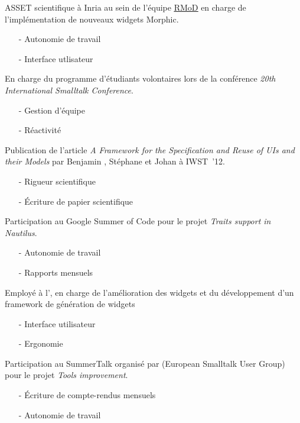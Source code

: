 \begin{rubric}{%
}
\entry*[01/03/2013 - 31/03/2013]
ASSET scientifique à Inria au sein de l'équipe \href{http://rmod.inria.fr/}{\underline{RMoD}} en charge de l'implémentation de nouveaux widgets Morphic.
\begin{itemize}
	\item[- ] Autonomie de travail
	\item[- ] Interface utlisateur
\end{itemize}


\entry*[26/08/2012 - 01/09/2012]
En charge du programme d'étudiants volontaires lors de la conférence \emph{20th International Smalltalk Conference}.
\begin{itemize}
	\item[- ] Gestion d'équipe
	\item[- ] Réactivité
\end{itemize}


\entry*[28/08/2012]
Publication de l'article \emph{A Framework for the Specification and Reuse of UIs and their Models} par Benjamin , Stéphane  et Johan  à IWST~'12.
\begin{itemize}
	\item[- ] Rigueur scientifique
	\item[- ] Écriture de papier scientifique
\end{itemize}


\entry*[01/05/2012 - 31/08/2012]
Participation au Google Summer of Code pour le projet \emph{Traits support in Nautilus}.
\begin{itemize}
	\item[- ] Autonomie de travail
	\item[- ] Rapports mensuels
\end{itemize}

\entry*[01/07/2012 - 15/08/2012]
Employé à l', en charge de l'amélioration des widgets et du développement d'un framework de génération de widgets
\begin{itemize}
	\item[- ] Interface utilisateur
	\item[- ] Ergonomie
\end{itemize}

\entry*[Été 2011]
Participation au SummerTalk organisé par  (European Smalltalk User Group) pour le projet \emph{Tools improvement}.
\begin{itemize}
	\item[- ] Écriture de compte-rendus mensuels
	\item[- ] Autonomie de travail
\end{itemize}



\end{rubric}
